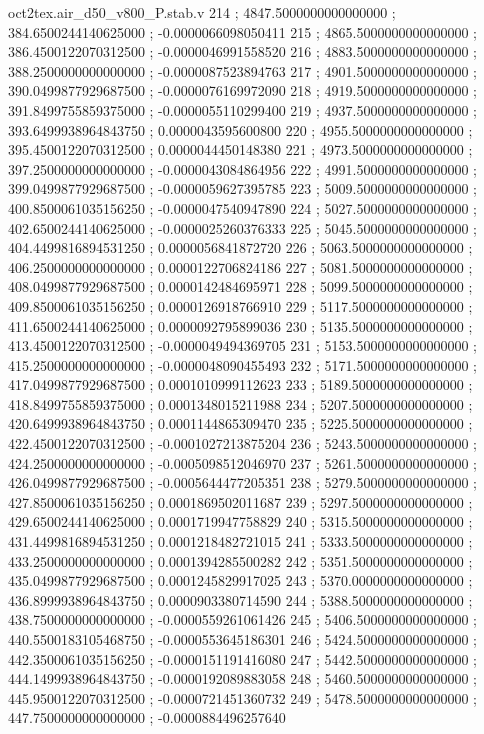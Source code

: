\begin{filecontents}[overwrite]{oct2tex.air_d50_v800_P.stab.v}
214 ; 4847.5000000000000000 ; 384.6500244140625000 ; -0.0000066098050411
215 ; 4865.5000000000000000 ; 386.4500122070312500 ; -0.0000046991558520
216 ; 4883.5000000000000000 ; 388.2500000000000000 ; -0.0000087523894763
217 ; 4901.5000000000000000 ; 390.0499877929687500 ; -0.0000076169972090
218 ; 4919.5000000000000000 ; 391.8499755859375000 ; -0.0000055110299400
219 ; 4937.5000000000000000 ; 393.6499938964843750 ; 0.0000043595600800
220 ; 4955.5000000000000000 ; 395.4500122070312500 ; 0.0000044450148380
221 ; 4973.5000000000000000 ; 397.2500000000000000 ; -0.0000043084864956
222 ; 4991.5000000000000000 ; 399.0499877929687500 ; -0.0000059627395785
223 ; 5009.5000000000000000 ; 400.8500061035156250 ; -0.0000047540947890
224 ; 5027.5000000000000000 ; 402.6500244140625000 ; -0.0000025260376333
225 ; 5045.5000000000000000 ; 404.4499816894531250 ; 0.0000056841872720
226 ; 5063.5000000000000000 ; 406.2500000000000000 ; 0.0000122706824186
227 ; 5081.5000000000000000 ; 408.0499877929687500 ; 0.0000142484695971
228 ; 5099.5000000000000000 ; 409.8500061035156250 ; 0.0000126918766910
229 ; 5117.5000000000000000 ; 411.6500244140625000 ; 0.0000092795899036
230 ; 5135.5000000000000000 ; 413.4500122070312500 ; -0.0000049494369705
231 ; 5153.5000000000000000 ; 415.2500000000000000 ; -0.0000048090455493
232 ; 5171.5000000000000000 ; 417.0499877929687500 ; 0.0001010999112623
233 ; 5189.5000000000000000 ; 418.8499755859375000 ; 0.0001348015211988
234 ; 5207.5000000000000000 ; 420.6499938964843750 ; 0.0001144865309470
235 ; 5225.5000000000000000 ; 422.4500122070312500 ; -0.0001027213875204
236 ; 5243.5000000000000000 ; 424.2500000000000000 ; -0.0005098512046970
237 ; 5261.5000000000000000 ; 426.0499877929687500 ; -0.0005644477205351
238 ; 5279.5000000000000000 ; 427.8500061035156250 ; 0.0001869502011687
239 ; 5297.5000000000000000 ; 429.6500244140625000 ; 0.0001719947758829
240 ; 5315.5000000000000000 ; 431.4499816894531250 ; 0.0001218482721015
241 ; 5333.5000000000000000 ; 433.2500000000000000 ; 0.0001394285500282
242 ; 5351.5000000000000000 ; 435.0499877929687500 ; 0.0001245829917025
243 ; 5370.0000000000000000 ; 436.8999938964843750 ; 0.0000903380714590
244 ; 5388.5000000000000000 ; 438.7500000000000000 ; -0.0000559261061426
245 ; 5406.5000000000000000 ; 440.5500183105468750 ; -0.0000553645186301
246 ; 5424.5000000000000000 ; 442.3500061035156250 ; -0.0000151191416080
247 ; 5442.5000000000000000 ; 444.1499938964843750 ; -0.0000192089883058
248 ; 5460.5000000000000000 ; 445.9500122070312500 ; -0.0000721451360732
249 ; 5478.5000000000000000 ; 447.7500000000000000 ; -0.0000884496257640

\end{filecontents}
